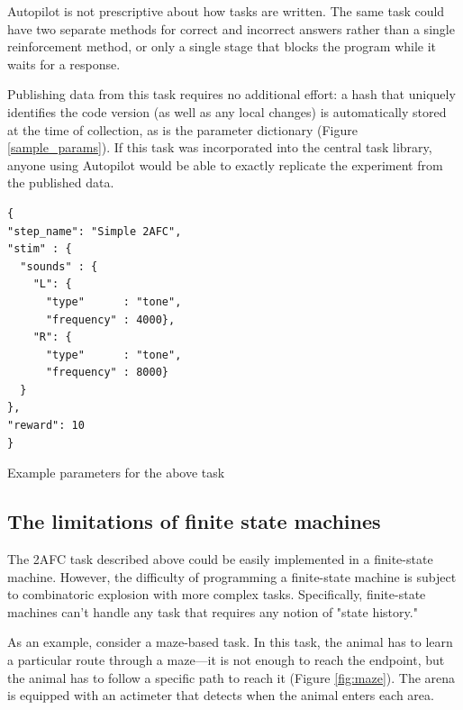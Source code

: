 Autopilot is not prescriptive about how tasks are written. The same task could have two separate methods for correct and incorrect answers rather than a single reinforcement method, or only a single stage that blocks the program while it waits for a response.

Publishing data from this task requires no additional effort: a hash that uniquely identifies the code version (as well as any local changes) is automatically stored at the time of collection, as is the parameter dictionary (Figure \ref{sample_params}). If this task was incorporated into the central task library, anyone using Autopilot would be able to exactly replicate the experiment from the published data.
\begin{marginfigure}[-2.8cm]
\begin{verbatim}
{
"step_name": "Simple 2AFC",
"stim" : {
  "sounds" : {
    "L": {
      "type"      : "tone",
      "frequency" : 4000},
    "R": {
      "type"      : "tone",
      "frequency" : 8000}
  }
},
"reward": 10
}
\end{verbatim}
\caption{Example parameters for the above task}
\label{sample_params}
\end{marginfigure}

\subsection{The limitations of finite state machines}
\label{sec:fsmlimits}

The 2AFC task described above could be easily implemented in a finite-state machine. However, the difficulty of programming a finite-state machine is subject to combinatoric explosion with more complex tasks. Specifically, finite-state machines can't handle any task that requires any notion of "state history." 

As an example, consider a maze-based task. In this task, the animal has to learn a particular route through a maze---it is not enough to reach the endpoint, but the animal has to follow a specific path to reach it (Figure \ref{fig:maze}). The arena is equipped with an actimeter that detects when the animal enters each area.


